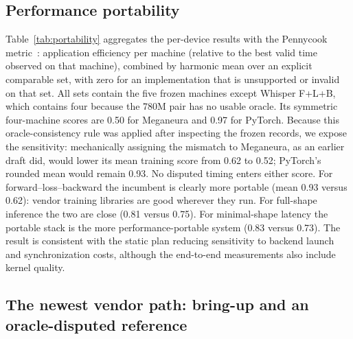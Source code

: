 \documentclass[10pt,twocolumn]{article}
\newcommand{\system}{Meganeura}
\begin{document}
\subsection{Performance portability}
\label{sec:portability}

\begin{table}[t]
\centering
\small
\setlength{\tabcolsep}{4.5pt}

\caption{Pennycook performance portability over the comparable frozen set,
strict mode. Application efficiency on each machine is measured against the
best \emph{valid} time either engine achieved there, so values are $\le 1$
and PyTorch's CPU fallback on the Intel machine counts as its own result on
that machine. $\ddagger$: Whisper F+L+B uses four machines because the 780M
pair is oracle-disputed and omitted for both implementations; every other
entry uses all five. Accelerated-mode values are in the artifact; they shift
the column means by at most 0.05 and change no ordering.}
\label{tab:portability}
\end{table}

Table~\ref{tab:portability} aggregates the per-device results with the
Pennycook metric~\cite{pennycook2016metric}: application efficiency per
machine (relative to the best valid time observed on that machine), combined
by harmonic mean over an explicit comparable set, with zero for an
implementation that is unsupported or invalid on that set. All sets contain
the five frozen machines except Whisper F+L+B, which contains four because
the 780M pair has no usable oracle. Its symmetric four-machine scores are
0.50 for \system{} and 0.97 for PyTorch. Because this oracle-consistency rule
was applied after inspecting the frozen records, we expose the sensitivity:
mechanically assigning the mismatch to \system{}, as an earlier draft did,
would lower its mean training score from 0.62 to 0.52; PyTorch's rounded mean
would remain 0.93. No disputed timing enters either score. For
forward--loss--backward the incumbent is clearly more portable (mean 0.93
versus 0.62): vendor training libraries are good wherever they run. For
full-shape inference the two are close (0.81 versus 0.75). For
minimal-shape latency the portable stack is the more performance-portable
system (0.83 versus 0.73). The result is consistent with the static plan
reducing sensitivity to backend launch and synchronization costs, although
the end-to-end measurements also include kernel quality.

\subsection{The newest vendor path: bring-up and an oracle-disputed reference}
\label{sec:apu}
\end{document}
